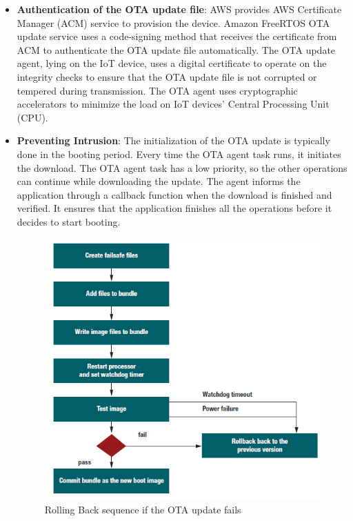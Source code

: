 \documentclass[12pt,a4paper]{article}
\begin{document}
\begin{itemize}
\item \textbf{Authentication of the OTA update file}: AWS provides AWS Certificate Manager (ACM) service to provision the device. Amazon FreeRTOS OTA update service uses a code-signing method that receives the certificate from ACM to authenticate the OTA update file automatically. The OTA update agent, lying on the IoT device, uses a digital certificate to operate on the integrity checks to ensure that the OTA update file is not corrupted or tempered during transmission. The OTA agent uses cryptographic accelerators to minimize the load on IoT devices' Central Processing Unit (CPU). \cite{r27}

\item \textbf{Preventing Intrusion}: The initialization of the OTA update is typically done in the booting period. Every time the OTA agent task runs, it initiates the download. The OTA agent task has a low priority, so the other operations can continue while downloading the update. The agent informs the application through a callback function when the download is finished and verified. It ensures that the application finishes all the operations before it decides to start booting. \cite{r27}


\begin{figure}[H]
\centering
\includegraphics[scale=0.75]{boot_sequence.PNG}
\caption{Rolling Back sequence if the OTA update fails \cite{r27}}
\label{boot_sequence}
\end{figure}


\end{itemize}
\end{document}
